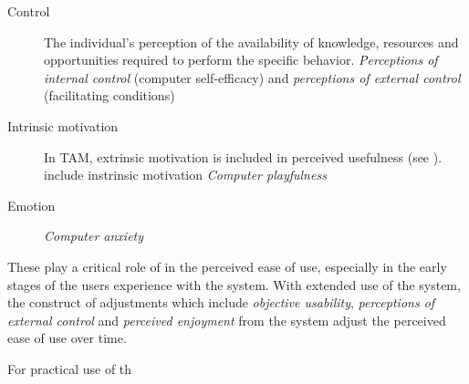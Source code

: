 \begin{description}
  \item[Control] The individual's perception of the availability of knowledge, resources and opportunities required to perform the specific behavior. \textit{Perceptions of internal control} (computer self-efficacy) and \textit{perceptions of external control} (facilitating conditions)
  \item[Intrinsic motivation] In TAM, extrinsic motivation is included in perceived usefulness (see \cite{Davis1989}). \cite{Venkatesh2000} include instrinsic motivation  \textit{Computer playfulness}
  \item[Emotion] \textit{Computer anxiety}
\end{description}

These play a critical role of in the perceived ease of use, especially in the early stages of the users experience with the system. With extended use of the system, the construct of adjustments which include \textit{objective usability}, \textit{perceptions of external control} and \textit{perceived enjoyment} from the system adjust the perceived ease of use over time.

For practical use of th


